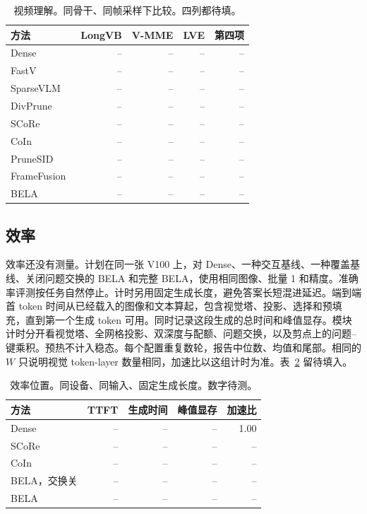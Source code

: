 \begin{table}[t]
\centering
\scriptsize
\setlength{\tabcolsep}{3pt}
\caption{视频理解。同骨干、同帧采样下比较。四列都待填。}
\label{tab:video}
\begin{tabular}{@{}lrrrr@{}}
\hline
方法 & LongVB & V-MME & LVE & 第四项 \\
\hline
Dense & -- & -- & -- & -- \\
FastV~\cite{fastv} & -- & -- & -- & -- \\
SparseVLM~\cite{sparsevlm} & -- & -- & -- & -- \\
DivPrune~\cite{divprune} & -- & -- & -- & -- \\
SCoRe~\cite{score} & -- & -- & -- & -- \\
CoIn~\cite{coin} & -- & -- & -- & -- \\
PruneSID~\cite{prunesid} & -- & -- & -- & -- \\
FrameFusion~\cite{framefusion} & -- & -- & -- & -- \\
BELA & -- & -- & -- & -- \\
\hline
\end{tabular}
\end{table}

\subsection{效率}
\label{sec:efficiency}

效率还没有测量。计划在同一张 V100 上，对 Dense、一种交互基线、一种覆盖基线、关闭问题交换的 BELA 和完整 BELA，使用相同图像、批量 1 和精度。准确率评测按任务自然停止。计时另用固定生成长度，避免答案长短混进延迟。端到端首 token 时间从已经载入的图像和文本算起，包含视觉塔、投影、选择和预填充，直到第一个生成 token 可用。同时记录这段生成的总时间和峰值显存。模块计时分开看视觉塔、全网格投影、双深度与配额、问题交换，以及剪点上的问题--键乘积。预热不计入稳态。每个配置重复数轮，报告中位数、均值和尾部。相同的 $W$ 只说明视觉 token-layer 数量相同，加速比以这组计时为准。表~\ref{tab:eff} 留待填入。

\begin{table}[t]
\centering
\scriptsize
\setlength{\tabcolsep}{3pt}
\caption{效率位置。同设备、同输入、固定生成长度。数字待测。}
\label{tab:eff}
\begin{tabular}{@{}lrrrr@{}}
\hline
方法 & TTFT & 生成时间 & 峰值显存 & 加速比 \\
\hline
Dense & -- & -- & -- & 1.00 \\
SCoRe~\cite{score} & -- & -- & -- & -- \\
CoIn~\cite{coin} & -- & -- & -- & -- \\
BELA，交换关 & -- & -- & -- & -- \\
BELA & -- & -- & -- & -- \\
\hline
\end{tabular}
\end{table}

